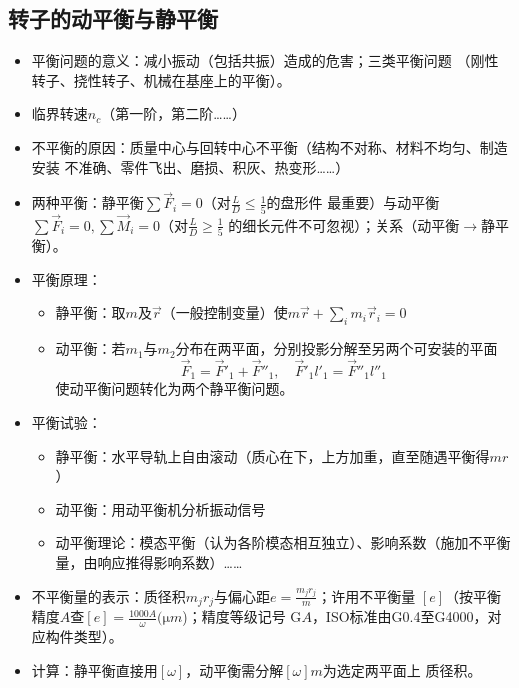 \documentclass[12pt,a4paper]{article}
\newcommand{\tightlist}{\setlength{\parskip}{0pt}\setlength{\itemsep}{0pt}}
\newcommand{\hint}[1]{\textsf{（#1）}}
\newcommand{\minor}[1]{{\color{gray} #1}}
\newcommand{\then}{$\to$}
\begin{document}
\subsection{转子的动平衡与静平衡}
\begin{itemize}\tightlist
    \item 平衡问题的意义：减小振动\hint{包括共振}造成的危害；三类平衡问题\minor{
    \hint{刚性转子、挠性转子、机械在基座上的平衡}}。
    \item 临界转速$n_c$\hint{第一阶，第二阶……}
    \item 不平衡的原因：质量中心与回转中心不平衡\hint{结构不对称、材料不均匀、制造安装
    不准确、零件飞出、磨损、积灰、热变形……}
    \item 两种平衡：静平衡$\sum \vec{F}_i=0$\hint{对$\frac LD\leq\frac15$的盘形件
    最重要}与动平衡$\sum\vec{F}_i=0,\sum\vec{M}_i=0$\hint{对$\frac LD\geq\frac15$
    的细长元件不可忽视}；关系\hint{动平衡\then 静平衡}。
    \item 平衡原理：
    \begin{itemize}\tightlist
        \item 静平衡：取$m$及$\vec{r}$\hint{一般控制变量}使$m\vec{r}+\sum_im_i
        \vec{r}_i=0$
        \item 动平衡：若$m_1$与$m_2$分布在两平面，分别投影分解至另两个可安装的平面
        \begin{equation}
        \vec{F}_1=\vec{F}'_1+\vec{F}''_1,\quad \vec{F}'_1l'_1=\vec{F}''_1l''_1
        \end{equation}
        使动平衡问题转化为两个静平衡问题。
    \end{itemize}
    \item 平衡试验：
    \begin{itemize}\tightlist
        \item 静平衡：水平导轨上自由滚动\hint{质心在下，上方加重，直至随遇平衡得$mr$}
        \item 动平衡：用动平衡机分析振动信号
        \item \minor{动平衡理论：模态平衡\hint{认为各阶模态相互独立}、影响系数\hint
        {施加不平衡量，由响应推得影响系数}……}
    \end{itemize}
    \item 不平衡量的表示：质径积$m_jr_j$与偏心距$e=\frac{m_jr_j}{m}$；许用不平衡量
    $[e]$\hint{按平衡精度$A$查$[e]=\frac{1000A}\omega(\si{\micro m}$)；精度等级记号
    G$A$，ISO标准由G0.4至G4000，对应构件类型}。
    \item \minor{计算：静平衡直接用$[\omega]$，动平衡需分解$[\omega]m$为选定两平面上
    质径积。}
\end{itemize}
\end{document}
